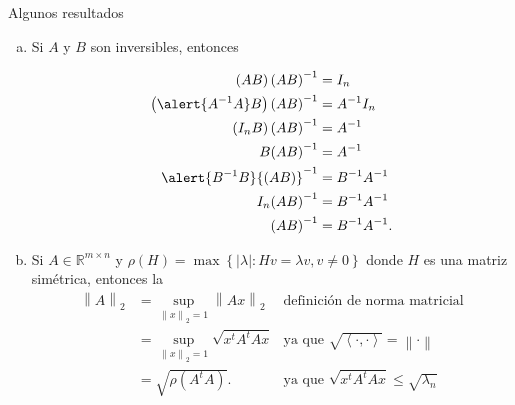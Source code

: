 \documentclass[
	spanish,
	8pt,
	utf8,
	xcolor=table,
	handout,
	aspectratio=169,
	professionalfonts,
	mathserif,
	leqno,
]{beamer}
\begin{document}
\begin{frame}
	\begin{alertblock}{Algunos resultados}

		\begin{enumerate}[(a)]


			\item

			      Si $A$ y $B$ son inversibles, entonces

			      \begin{align*}
				      \left(AB\right){\left(AB\right)}^{-1}
				       & =I_{n}         \\
				      \left(\alert{A^{-1}A}B\right)\left(AB\right)^{-1}
				       & =A^{-1}I_{n}   \\
				      \left(I_{n}B\right){\left(AB\right)}^{-1}
				       & =A^{-1}        \\
				      B{\left(AB\right)}^{-1}
				       & =A^{-1}        \\
				      \alert{B^{-1}B}{\left(AB\right)}^{-1}
				       & =B^{-1}A^{-1}  \\
				      I_{n}{\left(AB\right)}^{-1}
				       & =B^{-1}A^{-1}  \\
				      {\left(AB\right)}^{-1}
				       & =B^{-1}A^{-1}.
			      \end{align*}

			\item

			      Si $A\in\mathbb{R}^{m\times n}$ y
			      \begin{math}
				      \rho
				      \left(H\right)=
				      \max
				      \left\{
				      \left|\lambda\right|: Hv=\lambda v, v\neq0
				      \right\}
			      \end{math}
			      donde $H$ es una matriz simétrica,
			      entonces la
			      \begin{align*}
				      {\left\|A\right\|}_{2}
				                              & =
				      \sup\limits_{{\left\|x\right\|}_{2}=1}
				      {\left\|Ax\right\|}_{2} &
				      \text{definición de norma matricial} \\
				                              & =
				      \sup\limits_{{\left\|x\right\|}_{2}=1}
				      \sqrt{x^{t}A^{t}Ax}     &
				      \text{ya que }
				      \sqrt{\left\langle\cdot,\cdot\right\rangle}=
				      \left\|\cdot\right\|                 \\
				                              & =
				      \sqrt{\rho\left(A^{t}A\right)}.
				                              &
				      \text{ya que }\sqrt{x^{t}A^{t}Ax}\leq\sqrt{\lambda_{n}}
			      \end{align*}


\end{enumerate}
\end{alertblock}
\end{frame}
\end{document}
